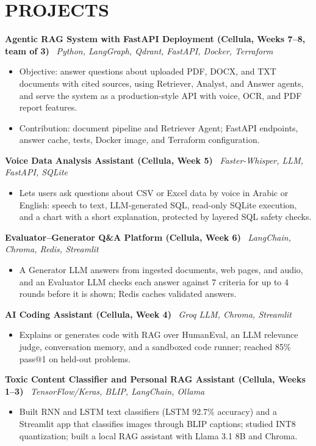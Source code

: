 \documentclass[10pt]{article}
\newcommand{\project}[2]{\textbf{#1} \textbar\ {\small\itshape #2}\par}
\begin{document}
\section{PROJECTS}
\project{Agentic RAG System with FastAPI Deployment (Cellula, Weeks 7--8, team of 3)}{Python, LangGraph, Qdrant, FastAPI, Docker, Terraform}
\begin{itemize}
\item Objective: answer questions about uploaded PDF, DOCX, and TXT documents with cited sources, using Retriever, Analyst, and Answer agents, and serve the system as a production-style API with voice, OCR, and PDF report features.
\item Contribution: document pipeline and Retriever Agent; FastAPI endpoints, answer cache, tests, Docker image, and Terraform configuration.
\end{itemize}
\project{Voice Data Analysis Assistant (Cellula, Week 5)}{Faster-Whisper, LLM, FastAPI, SQLite}
\begin{itemize}
\item Lets users ask questions about CSV or Excel data by voice in Arabic or English: speech to text, LLM-generated SQL, read-only SQLite execution, and a chart with a short explanation, protected by layered SQL safety checks.
\end{itemize}
\project{Evaluator--Generator Q\&A Platform (Cellula, Week 6)}{LangChain, Chroma, Redis, Streamlit}
\begin{itemize}
\item A Generator LLM answers from ingested documents, web pages, and audio, and an Evaluator LLM checks each answer against 7 criteria for up to 4 rounds before it is shown; Redis caches validated answers.
\end{itemize}
\project{AI Coding Assistant (Cellula, Week 4)}{Groq LLM, Chroma, Streamlit}
\begin{itemize}
\item Explains or generates code with RAG over HumanEval, an LLM relevance judge, conversation memory, and a sandboxed code runner; reached 85\% pass@1 on held-out problems.
\end{itemize}
\project{Toxic Content Classifier and Personal RAG Assistant (Cellula, Weeks 1--3)}{TensorFlow/Keras, BLIP, LangChain, Ollama}
\begin{itemize}
\item Built RNN and LSTM text classifiers (LSTM 92.7\% accuracy) and a Streamlit app that classifies images through BLIP captions; studied INT8 quantization; built a local RAG assistant with Llama 3.1 8B and Chroma.
\end{itemize}
\end{document}
